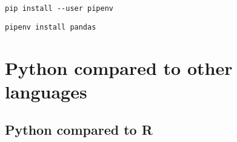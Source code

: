 \documentclass{article}
\begin{document}

\begin{lstlisting}
pip install --user pipenv
\end{lstlisting}

\begin{lstlisting}
pipenv install pandas
\end{lstlisting}

\pagebreak
\section{Python compared to other languages}

\subsection{Python compared to R}
\end{document}
